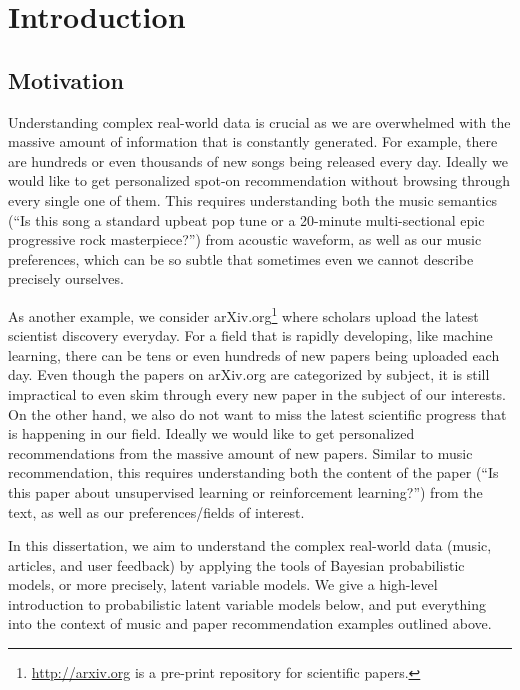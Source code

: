 
\chapter{Introduction}\label{chpt:intro}

\section{Motivation}\label{chpt:intro:sec:motivation}

Understanding complex real-world data is crucial as we are overwhelmed with the massive amount of information that is constantly generated. For example, there are hundreds or even thousands of new songs being released every day. Ideally we would like to get personalized spot-on recommendation without browsing through every single one of them. This requires understanding both the music semantics (``Is this song a standard upbeat pop tune or a 20-minute multi-sectional epic progressive rock masterpiece?'') from acoustic waveform, as well as our music preferences, which can be so subtle that sometimes even we cannot describe precisely ourselves.  

As another example, we consider arXiv.org\footnote{\url{http://arxiv.org} is a pre-print repository
for scientific papers.} where scholars upload the latest scientist discovery everyday. For a field that is rapidly developing, like machine learning, there can be tens or even hundreds of new papers being uploaded each day. Even though the papers on arXiv.org are categorized by subject, it is still impractical to even skim through every new paper in the subject of our interests. On the other hand, we also do not want to miss the latest scientific progress that is happening in our field. Ideally we would like to get personalized recommendations from the massive amount of new papers. Similar to music recommendation, this requires understanding both the content of the paper (``Is this paper about unsupervised learning or reinforcement learning?'') from the text, as well as our preferences/fields of interest. 

In this dissertation, we aim to understand the complex real-world data (music, articles, and user feedback) by applying the tools of Bayesian probabilistic models, or more precisely, latent variable models. We give a high-level introduction to probabilistic latent variable models below, and put everything into the context of music and paper recommendation examples outlined above. 

